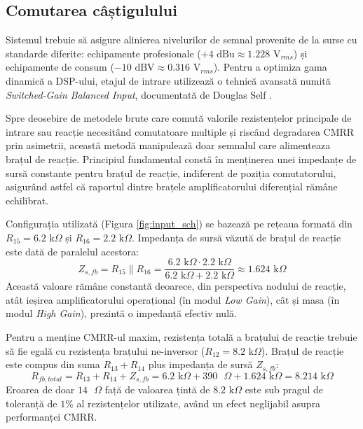 \subsection{Comutarea câștigulului }
Sistemul trebuie să asigure alinierea nivelurilor de semnal provenite de la surse cu standarde diferite: echipamente profesionale ($+4\text{ dBu} \approx 1.228\text{ V}_{rms}$) și echipamente de consum ($-10\text{ dBV} \approx 0.316\text{ V}_{rms}$). Pentru a optimiza gama dinamică a DSP-ului, etajul de intrare utilizează o tehnică avansată numită \textit{Switched-Gain Balanced Input}, documentată de Douglas Self \cite{douglasself}.

Spre deosebire de metodele brute care comută valorile rezistențelor principale de intrare sau reacție necesitând comutatoare multiple și riscând degradarea CMRR prin asimetrii, această metodă manipulează doar semnalul care alimenteaza brațul de reacție. Principiul fundamental constă în menținerea unei impedanțe de sursă constante pentru brațul de reacție, indiferent de poziția comutatorului, asigurând astfel că raportul dintre brațele amplificatorului diferențial rămâne echilibrat.

Configurația utilizată (Figura \ref{fig:input_sch}) se bazează pe rețeaua formată din $R_{15} = 6.2\text{ k}\Omega$ și $R_{16} = 2.2\text{ k}\Omega$. Impedanța de sursă văzută de brațul de reacție este dată de paralelul acestora:
\begin{equation}
    Z_{s,fb} = R_{15} \parallel R_{16} = \frac{6.2\text{ k}\Omega \cdot 2.2\text{ k}\Omega}{6.2\text{ k}\Omega + 2.2\text{ k}\Omega} \approx 1.624\text{ k}\Omega
\end{equation}
Această valoare rămâne constantă deoarece, din perspectiva nodului de reacție, atât ieșirea amplificatorului operațional (în modul \textit{Low Gain}), cât și masa (în modul \textit{High Gain}), prezintă o impedanță efectiv nulă. 

Pentru a menține CMRR-ul maxim, rezistența totală a brațului de reacție trebuie să fie egală cu rezistența brațului ne-inversor ($R_{12} = 8.2\text{ k}\Omega$). Brațul de reacție este compus din suma $R_{13} + R_{14}$ plus impedanța de sursă $Z_{s,fb}$:
\begin{equation}
    R_{fb,total} = R_{13} + R_{14} + Z_{s,fb} = 6.2\text{ k}\Omega + 390\text{ }\Omega + 1.624\text{ k}\Omega = 8.214\text{ k}\Omega
\end{equation}
Eroarea de doar $14\text{ }\Omega$ față de valoarea țintă de $8.2\text{ k}\Omega$ este sub pragul de toleranță de $1\%$ al rezistențelor utilizate, având un efect neglijabil asupra performanței CMRR.

